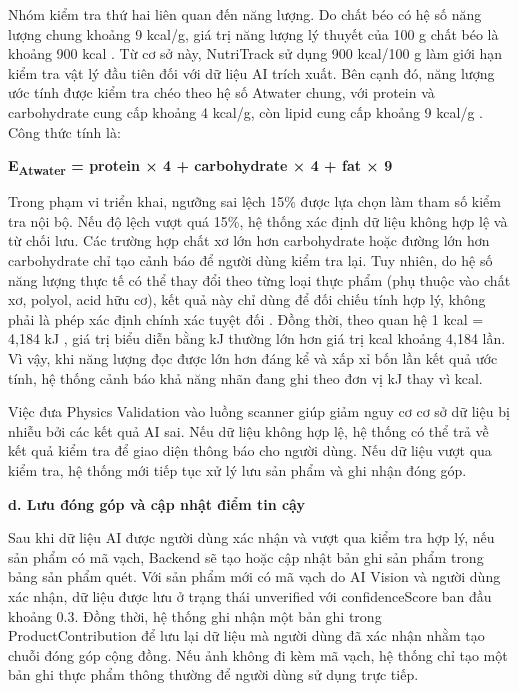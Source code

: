 \documentclass[12pt, a4paper]{report}
\begin{document}
Nhóm kiểm tra thứ hai liên quan đến năng lượng. Do chất béo có hệ số năng lượng chung khoảng 9 kcal/g, giá trị năng lượng lý thuyết của 100 g chất béo là khoảng 900 kcal \cite{vien_dinh_duong_2007, fao_2003}. Từ cơ sở này, NutriTrack sử dụng 900 kcal/100 g làm giới hạn kiểm tra vật lý đầu tiên đối với dữ liệu AI trích xuất. Bên cạnh đó, năng lượng ước tính được kiểm tra chéo theo hệ số Atwater chung, với protein và carbohydrate cung cấp khoảng 4 kcal/g, còn lipid cung cấp khoảng 9 kcal/g \cite{vien_dinh_duong_2007, fao_2003}. Công thức tính là:

\textbf{E\textsubscript{Atwater} = protein × 4 + carbohydrate × 4 + fat × 9}

Trong phạm vi triển khai, ngưỡng sai lệch 15\% được lựa chọn làm tham số kiểm tra nội bộ. Nếu độ lệch vượt quá 15\%, hệ thống xác định dữ liệu không hợp lệ và từ chối lưu. Các trường hợp chất xơ lớn hơn carbohydrate hoặc đường lớn hơn carbohydrate chỉ tạo cảnh báo để người dùng kiểm tra lại. Tuy nhiên, do hệ số năng lượng thực tế có thể thay đổi theo từng loại thực phẩm (phụ thuộc vào chất xơ, polyol, acid hữu cơ), kết quả này chỉ dùng để đối chiếu tính hợp lý, không phải là phép xác định chính xác tuyệt đối \cite{fao_2003}. Đồng thời, theo quan hệ 1 kcal = 4,184 kJ \cite{vien_dinh_duong_2007, fao_2003}, giá trị biểu diễn bằng kJ thường lớn hơn giá trị kcal khoảng 4,184 lần. Vì vậy, khi năng lượng đọc được lớn hơn đáng kể và xấp xỉ bốn lần kết quả ước tính, hệ thống cảnh báo khả năng nhãn đang ghi theo đơn vị kJ thay vì kcal.

Việc đưa Physics Validation vào luồng scanner giúp giảm nguy cơ cơ sở dữ liệu bị nhiễu bởi các kết quả AI sai. Nếu dữ liệu không hợp lệ, hệ thống có thể trả về kết quả kiểm tra để giao diện thông báo cho người dùng. Nếu dữ liệu vượt qua kiểm tra, hệ thống mới tiếp tục xử lý lưu sản phẩm và ghi nhận đóng góp.

\textbf{d. Lưu đóng góp và cập nhật điểm tin cậy}

Sau khi dữ liệu AI được người dùng xác nhận và vượt qua kiểm tra hợp lý, nếu sản phẩm có mã vạch, Backend sẽ tạo hoặc cập nhật bản ghi sản phẩm trong bảng sản phẩm quét. Với sản phẩm mới có mã vạch do AI Vision và người dùng xác nhận, dữ liệu được lưu ở trạng thái unverified với confidenceScore ban đầu khoảng 0.3. Đồng thời, hệ thống ghi nhận một bản ghi trong ProductContribution để lưu lại dữ liệu mà người dùng đã xác nhận nhằm tạo chuỗi đóng góp cộng đồng. Nếu ảnh không đi kèm mã vạch, hệ thống chỉ tạo một bản ghi thực phẩm thông thường để người dùng sử dụng trực tiếp.
\end{document}
